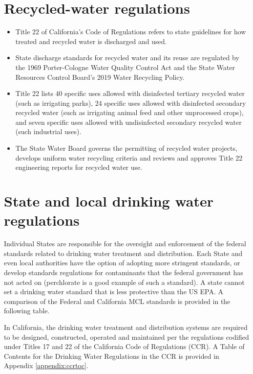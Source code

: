 \section{Recycled-water regulations}
\begin{itemize}
\item Title 22 of California’s Code of Regulations refers to state guidelines for how treated and recycled water is discharged and used.

\item State discharge standards for recycled water and its reuse are regulated by the 1969 Porter-Cologne Water Quality Control Act and the State Water Resources Control Board’s 2019 Water Recycling Policy.\\

\item Title 22 lists 40 specific uses allowed with disinfected tertiary recycled water (such as irrigating parks), 24 specific uses allowed with disinfected secondary recycled water (such as irrigating animal feed and other unprocessed crops), and seven specific uses allowed with undisinfected secondary recycled water (such industrial uses).\\

\item The State Water Board governs the permitting of recycled water projects, develops uniform water recycling criteria and reviews and approves Title 22 engineering reports for recycled water use.\\
\end{itemize}


\section{State and local drinking water regulations}
Individual States are responsible for the oversight and enforcement of the federal standards related to drinking water treatment and distribution.  Each State and even local authorities have the option of adopting more stringent standards, or develop standards regulations for contaminants that the federal government has not acted on (perchlorate is a good example of such a standard). A state cannot set a drinking water standard that is less protective than the US EPA.  A comparison of the Federal and California MCL standards is provided in the following table.
\vspace{0.3cm}


In California, the drinking water treatment and distribution systems are required to be designed, constructed, operated and maintained per the regulations codified under Titles 17 and 22 of the California Code of Regulations (CCR).  A Table of Contents for the Drinking Water Regulations in the CCR is provided in Appendix \ref{appendix:ccrtoc}. 


